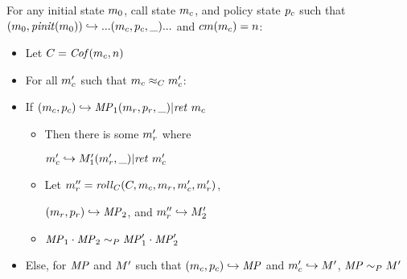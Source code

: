 \documentclass[conference]{IEEEtran}
\begin{document}
      For any initial state \(m_0\), call state \(m_c\), and policy state \(p_c\) such that
      \((m_0,\mathit{pinit}(m_0)) \hookrightarrow ... (m_c,p_c,\_) ...\) and
      \(cm(m_c) = n\):

      \begin{itemize}
        \item Let \(C = \mathit{Cof}(m_c,n)\)
        \item For all \(m_c'\) such that \(m_c \approx_C m_c'\):
        \item If \((m_c,p_c) \hookrightarrow \mathit{MP}_1 (m_r,p_r,\_) | \mathit{ret}\ m_c\)
          \begin{itemize}
            \item Then there is some \(m_r'\) where

              \(m_c' \hookrightarrow M_1' (m_r',\_) | \mathit{ret}\ m_c'\)
            \item Let \(m_r'' = \mathit{roll}_C(C,m_c,m_r,m_c',m_r')\),

              \((m_r,p_r) \hookrightarrow \mathit{MP}_2\), and \(m_r'' \hookrightarrow M_2'\)
            \item \(\mathit{MP}_1 \cdot \mathit{MP}_2 \sim_P \mathit{MP}_1' \cdot \mathit{MP}_2'\)
          \end{itemize}
        \item Else, for \(\mathit{MP}\) and \(M'\) such that \((m_c,p_c) \hookrightarrow \mathit{MP}\)
          and \(m_c' \hookrightarrow M'\), \(\mathit{MP} \sim_P M'\)
      \end{itemize}
\end{document}

